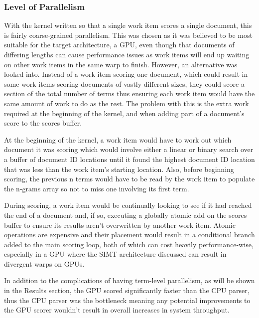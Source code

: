 \subsubsection{Level of Parallelism}

With the kernel written so that a single work item scores a single document,
this is fairly coarse-grained parallelism. This was chosen as it was believed to
be most suitable for the target architecture, a GPU, even though that documents
of differing lengths can cause performance issues as work items will end up
waiting on other work items in the same warp to finish. However, an alternative
was looked into. Instead of a work item scoring one document, which could result
in some work items scoring documents of vastly different sizes, they could score
a section of the total number of terms thus ensuring each work item would have
the same amount of work to do as the rest. The problem with this is the extra
work required at the beginning of the kernel, and when adding part of a
document's score to the scores buffer.

At the beginning of the kernel, a work item would have to work out which
document it was scoring which would involve either a linear or binary search
over a buffer of document ID locations until it found the highest document
ID location that was less than the work item's starting location. Also, before
beginning scoring, the previous n terms would have to be read by the work item
to populate the n-grams array so not to miss one involving its first term.

During scoring, a work item would be continually looking to see if it had
reached the end of a document and, if so, executing a globally atomic add on the
scores buffer to ensure its results aren't overwritten by another work item.
Atomic operations are expensive and their placement would result in a
conditional branch added to the main scoring loop, both of which can cost
heavily performance-wise, especially in a GPU where the SIMT architecture
discussed can result in divergent warps on GPUs.

In addition to the complications of having term-level parallelism, as will be
shown in the Results section, the GPU scored significantly faster than the CPU
parser, thus the CPU parser was the bottleneck meaning any potential
improvements to the GPU scorer wouldn't result in overall increases in system
throughput.

